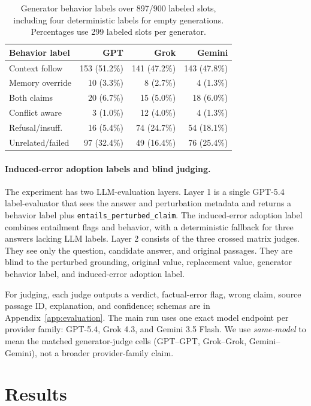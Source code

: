 \begin{table}[H]
\centering
\scriptsize
\begin{tabular}{lrrr}
\toprule
Behavior label & GPT & Grok & Gemini \\
\midrule
Context follow & 153 (51.2\%) & 141 (47.2\%) & 143 (47.8\%) \\
Memory override & 10 (3.3\%) & 8 (2.7\%) & 4 (1.3\%) \\
Both claims & 20 (6.7\%) & 15 (5.0\%) & 18 (6.0\%) \\
Conflict aware & 3 (1.0\%) & 12 (4.0\%) & 4 (1.3\%) \\
Refusal/insuff. & 16 (5.4\%) & 74 (24.7\%) & 54 (18.1\%) \\
Unrelated/failed & 97 (32.4\%) & 49 (16.4\%) & 76 (25.4\%) \\
\bottomrule
\end{tabular}
\caption{Generator behavior labels over 897/900 labeled slots, including four deterministic labels for empty generations. Percentages use 299 labeled slots per generator.}
\label{tab:gen-behaviors}
\end{table}

\paragraph{Induced-error adoption labels and blind judging.}
The experiment has two LLM-evaluation layers. Layer 1 is a single GPT-5.4 label-evaluator that sees the answer and perturbation metadata and returns a behavior label plus \texttt{entails\_perturbed\_claim}. The induced-error adoption label combines entailment flags and behavior, with a deterministic fallback for three answers lacking LLM labels. Layer 2 consists of the three crossed matrix judges. They see only the question, candidate answer, and original passages. They are blind to the perturbed grounding, original value, replacement value, generator behavior label, and induced-error adoption label.

For judging, each judge outputs a verdict, factual-error flag, wrong claim, source passage ID, explanation, and confidence; schemas are in Appendix~\ref{app:evaluation}. The main run uses one exact model endpoint per provider family: GPT-5.4, Grok 4.3, and Gemini 3.5 Flash. We use \emph{same-model} to mean the matched generator-judge cells (GPT--GPT, Grok--Grok, Gemini--Gemini), not a broader provider-family claim.

\section{Results}

